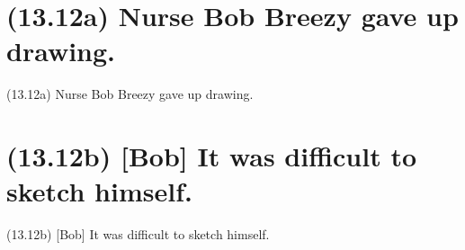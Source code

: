 \documentclass{article}
\begin{document}
\clearpage

%
%

\section*{(13.12a) Nurse Bob Breezy gave up drawing.}

\bigbreak
\begin{enumerate*}
\item[(13.12a)] Nurse Bob Breezy gave up drawing.
\end{enumerate*}
\bigbreak

\bigbreak
\begin{minipage}{\textwidth}
\end{minipage}
\bigbreak

\clearpage

%
%

\section*{(13.12b) [Bob] It was difficult to sketch himself.}

\bigbreak
\begin{enumerate*}
\item[(13.12b)] [Bob] It was difficult to sketch himself.
\end{enumerate*}
\bigbreak
\end{document}

